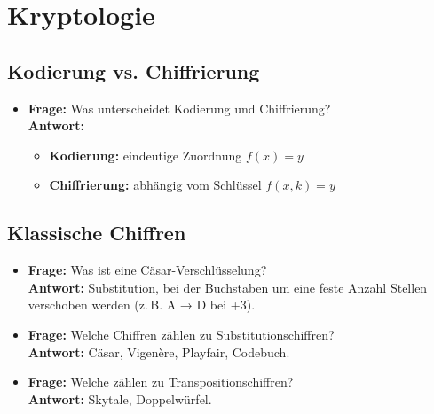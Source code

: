 \documentclass[a4paper,12pt]{article}
\begin{document}
\section*{Kryptologie}

\subsection*{Kodierung vs. Chiffrierung}
\begin{itemize}[leftmargin=*]
  \item \textbf{Frage:} Was unterscheidet Kodierung und Chiffrierung?\\
  \textbf{Antwort:} 
  \begin{itemize}
    \item \textbf{Kodierung:} eindeutige Zuordnung \(f(x) = y\)
    \item \textbf{Chiffrierung:} abhängig vom Schlüssel \(f(x, k) = y\)
  \end{itemize}
\end{itemize}

\subsection*{Klassische Chiffren}
\begin{itemize}[leftmargin=*]
  \item \textbf{Frage:} Was ist eine Cäsar-Verschlüsselung?\\
  \textbf{Antwort:} Substitution, bei der Buchstaben um eine feste Anzahl Stellen verschoben werden (z. B. A → D bei +3).

  \item \textbf{Frage:} Welche Chiffren zählen zu Substitutionschiffren?\\
  \textbf{Antwort:} Cäsar, Vigenère, Playfair, Codebuch.

  \item \textbf{Frage:} Welche zählen zu Transpositionschiffren?\\
  \textbf{Antwort:} Skytale, Doppelwürfel.
\end{itemize}
\end{document}
